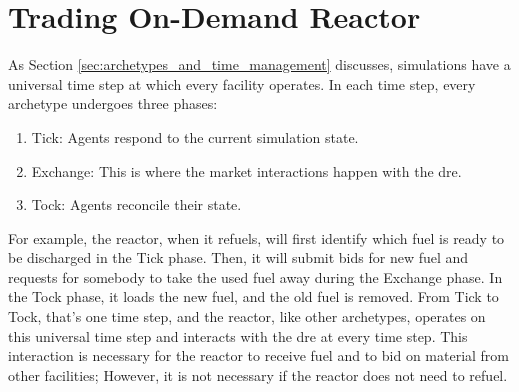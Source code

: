 
\section{Trading On-Demand Reactor}
\label{sec:trading_reactor}

As Section \ref{sec:archetypes_and_time_management} discusses, \cyclus simulations have a universal time step at which every facility operates. In each \cyclus time step, every archetype undergoes three phases:
\begin{enumerate}
    \item Tick: Agents respond to the current simulation state.
    \item Exchange: This is where the market interactions happen with the \gls{dre}.
    \item Tock: Agents reconcile their state.
\end{enumerate}

For example, the \cycamore reactor, when it refuels, will first identify which fuel is ready to be discharged in the Tick phase. Then, it will submit bids for new fuel and requests for somebody to take the used fuel away during the Exchange phase. In the Tock phase, it loads the new fuel, and the old fuel is removed. From Tick to Tock, that's one time step, and the \cycamore reactor, like other archetypes, operates on this universal time step and interacts with the \gls{dre} at every time step. This interaction is necessary for the reactor to receive fuel and to bid on material from other facilities; However, it is not necessary if the reactor does not need to refuel.




